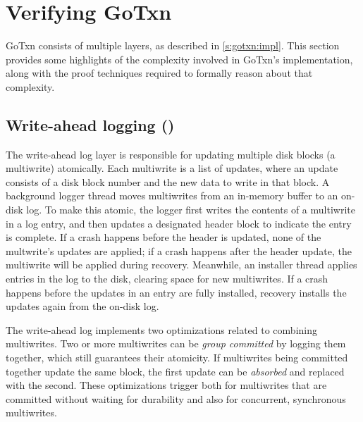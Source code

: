 \section{Verifying GoTxn}
\label{s:proof}

GoTxn consists of multiple layers, as described in \cref{s:gotxn:impl}. This
section provides some highlights of the complexity involved in GoTxn's
implementation, along with the proof techniques required to formally
reason about that complexity.

\subsection{Write-ahead logging ()}

The write-ahead log layer is responsible for updating multiple disk
blocks (a multiwrite) atomically.
Each multiwrite is a list
of updates, where an update consists of a disk block number and the new data to write in that block.
A background logger thread moves multiwrites from an in-memory buffer to an
on-disk log. To make this atomic, the logger first writes
the contents of a multiwrite in a log entry, and then updates a designated header block to indicate
the entry is complete. If a crash
happens before the header is updated, none of the multwrite's updates
are applied; if a crash happens after the header update, the multiwrite
will be applied during recovery.
Meanwhile, an installer thread applies entries in the log to the disk, clearing
space for new multiwrites.
If a crash happens before the updates in an entry are fully installed,
recovery installs the updates again from the on-disk log.

The write-ahead log implements two optimizations related to combining
multiwrites. Two or more multiwrites can be \emph{group committed} by logging
them together, which still guarantees their atomicity. If multiwrites being
committed together update the same block, the first update can be
\emph{absorbed} and replaced with the second. These optimizations trigger both
for multiwrites that are committed without waiting for durability and also for
concurrent, synchronous multiwrites.

%

